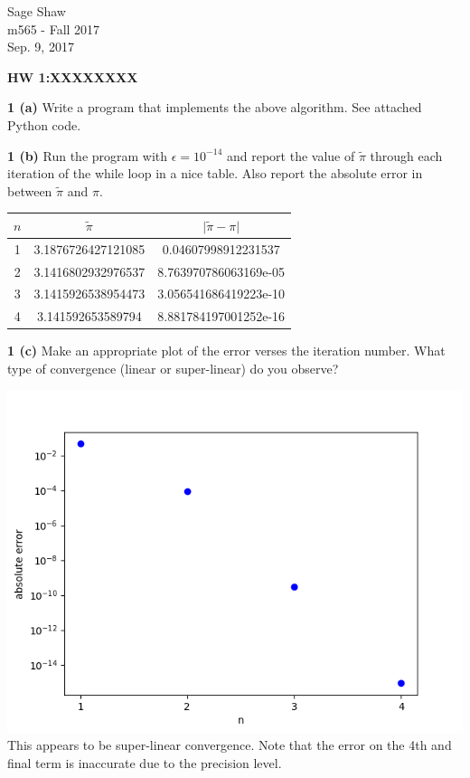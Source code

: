 \documentclass[12pt]{article}
\begin{document}
\thispagestyle{empty}
	
\begin{flushright}
Sage Shaw \\
m565 - Fall 2017 \\
Sep. 9, 2017
\end{flushright}
	
{\large \textbf{HW 1:XXXXXXXX}}\bigbreak

\hspace{-7 ex}\textbf{1 (a)} Write a program that implements the above algorithm. \bigbreak
	See attached Python code. \bigbreak
	
\hspace{-7 ex}\textbf{1 (b) } Run the program with $\epsilon = 10^{−14}$ and report the value of $\tilde{\pi}$ through each iteration of the
while loop in a nice table. Also report the absolute error in between $\tilde{\pi}$ and $\pi$. \bigbreak

	\begin{center}
		\begin{tabular}{|c|c|c|}
			\hline
			$n$ & $\tilde{\pi}$ & $\vert \tilde{\pi} - \pi \vert$ \\ \hline
			1 & 3.1876726427121085 & 0.04607998912231537 \\ \hline
			2 & 3.1416802932976537 & 8.763970786063169e-05 \\ \hline
			3 & 3.1415926538954473 & 3.056541686419223e-10 \\ \hline
			4 & 3.141592653589794 & 8.881784197001252e-16 \\ \hline
		\end{tabular}
	\end{center}
	

	
\hspace{-7 ex}\textbf{1 (c) } Make an appropriate plot of the error verses the iteration number. What type of convergence (linear or super-linear) do you observe? \bigbreak

	\includegraphics[scale=.65]{Figure_1} \\
	This appears to be super-linear convergence. Note that the error on the 4th and final term is inaccurate due to the precision level. \bigbreak
\end{document}
